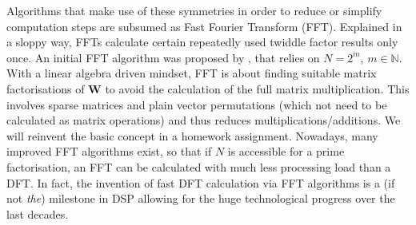 \documentclass[11pt,a4paper,DIV=12]{scrartcl}
\begin{document}
Algorithms that make use of these symmetries in order to reduce or simplify
computation steps are subsumed as Fast Fourier Transform (FFT).
%
Explained in a sloppy way, FFTs calculate certain repeatedly used twiddle factor
results only once.
%
An initial FFT algorithm was proposed by \cite{Cooley1965},
that relies on $N=2^m$, $m\in\mathbb{N}$.
%
With a linear algebra driven mindset, FFT is about finding
suitable matrix factorisations of $\bm W$ to avoid the calculation of the full
matrix multiplication.
%
This involves sparse matrices and plain
vector permutations (which not need to be calculated as matrix operations) and
thus reduces multiplications/additions.
%
We will reinvent the basic concept in a homework assignment.
%
Nowadays, many improved FFT algorithms exist, so that if $N$
is accessible for a prime factorisation, an FFT can be calculated with much less
processing load than a DFT.
%
In fact, the invention of fast DFT calculation via FFT algorithms
is a (if not \textit{the}) milestone in DSP allowing for the huge
technological progress over the last decades.
\end{document}
